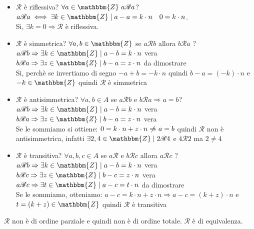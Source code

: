 \documentclass[12pt, letterpaper]{report}
\begin{document}
		\begin{itemize}
			\item $\mathscr{R}$ è riflessiva? $\forall a \in \mathbbm{Z}\ a \mathscr{R} a$? \\
			$a \mathscr{R} a \iff \exists k \in \mathbbm{Z} \mid a - a = k \cdot n \quad 0 = k \cdot n$. \\ Si, $\exists k = 0 \Rightarrow \mathscr{R}$ è riflessiva.
			\item $\mathscr{R}$ è simmetrica? $\forall a,b \in \mathbbm{Z}$ se $a \mathscr{R} b$ allora $b \mathscr{R} a$ ? \\
			$a \mathscr{R} b \Rightarrow \exists k \in \mathbbm{Z} \mid a - b = k \cdot n$ vera\\
			$b \mathscr{R} a \Rightarrow \exists z \in \mathbbm{Z} \mid b - a = z \cdot n$ da dimostrare\\
			Si, perchè se invertiamo di segno $-a + b = -k \cdot n$ quindi $b - a = (-k) \cdot n$ e $-k \in \mathbbm{Z}$ quindi $\mathscr{R}$ è simmetrica
			\item $\mathscr{R}$ è antisimmetrica? $\forall a,b \in A$ se $a \mathscr{R} b$ e $b \mathscr{R} a \Rightarrow a = b$? \\
			$a \mathscr{R} b \Rightarrow \exists k \in \mathbbm{Z} \mid a - b = k \cdot n$ vera\\
			$b \mathscr{R} a \Rightarrow \exists z \in \mathbbm{Z} \mid b - a = z \cdot n$ vera \\
			Se le sommiamo si ottiene: $0 = k\cdot n + z \cdot n \centernot{\Rightarrow} a = b$ quindi $\mathscr{R}$ non è antisimmetrica, infatti $\exists 2,4 \in \mathbbm{Z} \mid 2 \mathscr{R} 4$ e $4 \mathscr{R} 2$ ma $2 \neq 4$
			\item $\mathscr{R}$ è transitiva? $\forall a,b,c \in A$ se $a \mathscr{R}$ e $b \mathscr{R} c$ allora $a \mathscr{R} c$ ? \\
			$a \mathscr{R} b \Rightarrow \exists k \in \mathbbm{Z} \mid a - b = k \cdot n$ vera\\
			$b \mathscr{R} c \Rightarrow \exists z \in \mathbbm{Z} \mid b - c = z \cdot n$ vera\\
			$a \mathscr{R} c \Rightarrow \exists t \in \mathbbm{Z} \mid a - c = t \cdot n$ da dimostrare\\
			Se le sommiamo, otteniamo: $a - c = k \cdot n + z \cdot n \Rightarrow a - c = (k + z) \cdot n$ e $t = (k + z) \in \mathbbm{Z}$ quindi $\mathscr{R}$ è transitiva
		\end{itemize}
		$\mathscr{R}$ non è di ordine parziale e quindi non è di ordine totale. $\mathscr{R}$ è di equivalenza.
\end{document}
